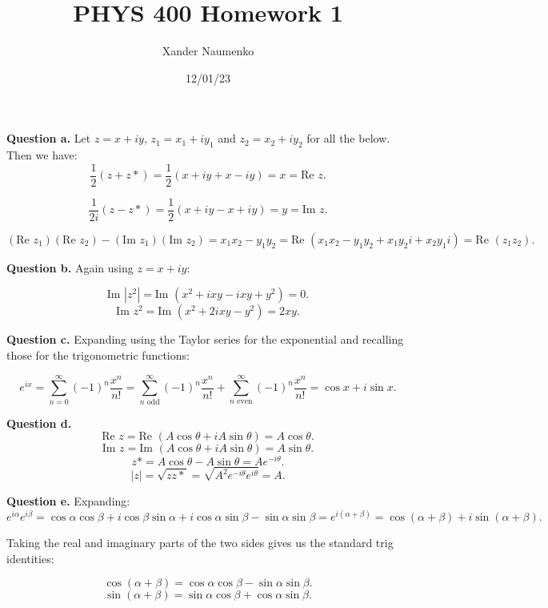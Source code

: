 \documentclass[letterpaper, reqno,11pt]{article}
\begin{document}
\title{PHYS 400 Homework 1}
\date{12/01/23}
\author{Xander Naumenko}
\maketitle

{\noindent\bf Question a.} Let $z=x+iy$, $z_1=x_1+iy_1$ and $z_2=x_2+iy_2$ for all the below. Then we have: 
\[
    \frac{1}{2}\left( z+z* \right)=\frac{1}{2}\left( x+iy+x-iy \right)=x=\text{Re } z
.\]

\[
    \frac{1}{2i}\left( z-z* \right)=\frac{1}{2}\left( x+iy-x+iy \right)=y=\text{Im } z
.\]

\[
    \left( \text{Re }z_1 \right) \left( \text{Re } z_2 \right) -\left( \text{Im }z_1 \right) \left( \text{Im }z_2 \right) =x_1x_2-y_1y_2=\text{Re }\left( x_1x_2-y_1y_2+x_1y_2i+x_2y_1i \right) =\text{Re }\left( z_1z_2 \right) 
.\]

{\noindent\bf Question b.} Again using $z=x+iy$:

 \[
\text{Im }\left| z^2 \right| =\text{Im }\left( x^2+ixy-ixy+y^2 \right)=0
.\]
\[
\text{Im }z^2=\text{Im }\left( x^2+2ixy-y^2 \right)=2xy
.\]

{\noindent\bf Question c.} Expanding using the Taylor series for the exponential and recalling those for the trigonometric functions: 

\[
e^{ix}= \sum_{n=0}^{\infty} \left( -1 \right)^{n} \frac{x^{n}}{n!}=\sum_{n\text{ odd}}^{\infty} \left( -1 \right)^{n} \frac{x^{n}}{n!}+\sum_{n\text{ even}}^{\infty} \left( -1 \right)^{n} \frac{x^{n}}{n!}=\cos x + i\sin x
.\]

{\noindent\bf Question d.} 
\[
    \text{Re }z=\text{Re }\left( A\cos \theta + iA\sin \theta \right) =A\cos \theta
.\]
\[
\text{Im }z=\text{Im }\left( A\cos \theta + iA\sin \theta \right) = A\sin \theta
.\]
\[
z*=A\cos\theta-A\sin\theta=Ae^{-i\theta}
.\]
\[
    |z|=\sqrt{ zz*}=\sqrt{A^2e^{-i\theta}e^{i\theta}} =A
.\]

{\noindent\bf Question e.} Expanding: 
\[
e^{i\alpha}e^{i\beta}=\cos\alpha\cos\beta+i\cos\beta\sin\alpha+i\cos\alpha\sin\beta-\sin\alpha\sin\beta=e^{i(\alpha+\beta)}=\cos\left( \alpha+\beta \right) +i\sin\left( \alpha+\beta \right) 
.\]

Taking the real and imaginary parts of the two sides gives us the standard trig identities: 

\[
\cos(\alpha+\beta)=\cos\alpha\cos\beta-\sin\alpha\sin\beta
.\]
\[
\sin(\alpha+\beta)=\sin\alpha\cos\beta+\cos\alpha\sin\beta
.\]
\end{document}
